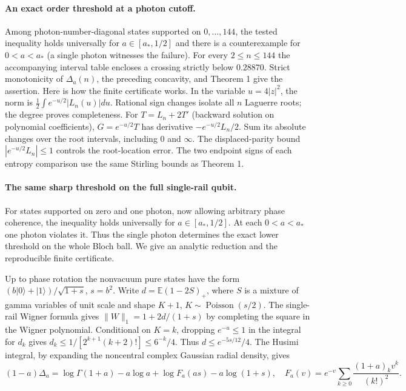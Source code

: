 \documentclass[11pt]{article}
\newcommand{\D}{\Delta}
\begin{document}
\paragraph{An exact order threshold at a photon cutoff.}
Among photon-number-diagonal states supported on $0,\ldots,144$, the tested inequality holds universally for $a\in[a_*,1/2]$ and there is a counterexample for $0<a<a_*$ (a single photon witnesses the failure). For every $2\le n\le144$ the accompanying interval table encloses a crossing strictly below $0.28870$. Strict monotonicity of $\D_a(n)$, the preceding concavity, and Theorem 1 give the assertion. Here is how the finite certificate works. In the variable $u=4|z|^2$, the norm is $\tfrac12\int e^{-u/2}|L_n(u)|du$. Rational sign changes isolate all $n$ Laguerre roots; the degree proves completeness. For $T=L_n+2T'$ (backward solution on polynomial coefficients), $G=e^{-u/2}T$ has derivative $-e^{-u/2}L_n/2$. Sum its absolute changes over the root intervals, including $0$ and $\infty$. The displaced-parity bound $|e^{-u/2}L_n|\le1$ controls the root-location error. The two endpoint signs of each entropy comparison use the same Stirling bounds as Theorem 1.

\paragraph{The same sharp threshold on the full single-rail qubit.}
For states supported on zero and one photon, now allowing arbitrary phase coherence, the inequality holds universally for $a\in[a_*,1/2]$. At each $0<a<a_*$ one photon violates it. Thus the single photon determines the exact lower threshold on the whole Bloch ball. We give an analytic reduction and the reproducible finite certificate.

Up to phase rotation the nonvacuum pure states have the form $(b|0\rangle+|1\rangle)/\sqrt{1+s}$, $s=b^2$. Write $d=\mathbb E(1-2S)_+$, where $S$ is a mixture of gamma variables of unit scale and shape $K+1$, $K\sim\operatorname{Poisson}(s/2)$. The single-rail Wigner formula gives $\|W\|_1=1+2d/(1+s)$ by completing the square in the Wigner polynomial. Conditional on $K=k$, dropping $e^{-u}\le1$ in the integral for $d_k$ gives $d_k\le 1/[2^{k+1}(k+2)!]\le6^{-k}/4$. Thus $d\le e^{-5s/12}/4$. The Husimi integral, by expanding the noncentral complex Gaussian radial density, gives
\[
 (1-a)\D_a=\log\Gamma(1+a)-a\log a+\log F_a(as)-a\log(1+s),\quad
 F_a(v)=e^{-v}\sum_{k\ge0}\frac{(1+a)_k v^k}{(k!)^2}.
\]
\end{document}
